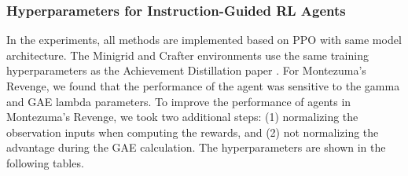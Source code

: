 \documentclass{article}
\theoremstyle{plain}
\theoremstyle{definition}
\theoremstyle{remark}
\begin{document}
\begin{table}[H]
    \centering
    \caption{Performance of fine-tuned VLM reward model on the testing dataset using the 90th percentile empirical quantile as threshold}
    \label{tab:vlm_performance}
    \end{table}


\subsubsection{Hyperparameters for Instruction-Guided RL Agents}
In the experiments, all methods are implemented based on PPO with same model architecture. The Minigrid and Crafter environments use the same training hyperparameters as the Achievement Distillation paper \citep{moon2023ad}. For Montezuma's Revenge, we found that the performance of the agent was sensitive to the gamma and GAE lambda parameters. To improve the performance of agents in Montezuma's Revenge, we took two additional steps: (1) normalizing the observation inputs when computing the rewards, and (2) not normalizing the advantage during the GAE calculation. The hyperparameters are shown in the following tables.
\end{document}
